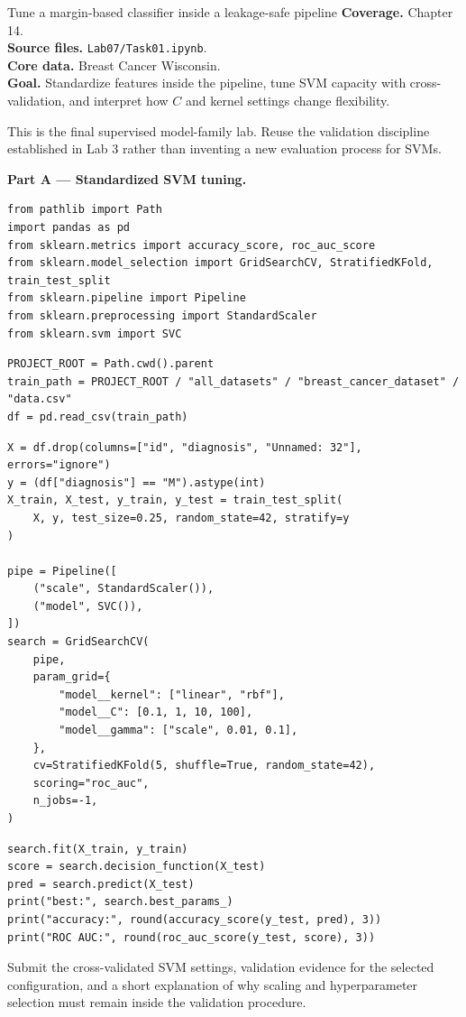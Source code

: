 
\begin{labproject}{Tune a margin-based classifier inside a leakage-safe pipeline}
\textbf{Coverage.} Chapter 14.\\
\textbf{Source files.} \texttt{Lab07/Task01.ipynb}.\\
\textbf{Core data.} Breast Cancer Wisconsin.\\
\textbf{Goal.} Standardize features inside the pipeline, tune SVM capacity with cross-validation, and interpret how $C$ and kernel settings change flexibility.

\begin{labmode}
This is the final supervised model-family lab. Reuse the validation discipline established in Lab 3 rather than inventing a new evaluation process for SVMs.
\end{labmode}

\medskip\noindent\textbf{Part A --- Standardized SVM tuning.}\par
\begin{lstlisting}[style=mlpython]
from pathlib import Path
import pandas as pd
from sklearn.metrics import accuracy_score, roc_auc_score
from sklearn.model_selection import GridSearchCV, StratifiedKFold, train_test_split
from sklearn.pipeline import Pipeline
from sklearn.preprocessing import StandardScaler
from sklearn.svm import SVC
\end{lstlisting}

\begin{lstlisting}[style=mlpython]
PROJECT_ROOT = Path.cwd().parent
train_path = PROJECT_ROOT / "all_datasets" / "breast_cancer_dataset" / "data.csv"
df = pd.read_csv(train_path)
\end{lstlisting}

\begin{lstlisting}[style=mlpython]
X = df.drop(columns=["id", "diagnosis", "Unnamed: 32"], errors="ignore")
y = (df["diagnosis"] == "M").astype(int)
X_train, X_test, y_train, y_test = train_test_split(
    X, y, test_size=0.25, random_state=42, stratify=y
)

pipe = Pipeline([
    ("scale", StandardScaler()),
    ("model", SVC()),
])
search = GridSearchCV(
    pipe,
    param_grid={
        "model__kernel": ["linear", "rbf"],
        "model__C": [0.1, 1, 10, 100],
        "model__gamma": ["scale", 0.01, 0.1],
    },
    cv=StratifiedKFold(5, shuffle=True, random_state=42),
    scoring="roc_auc",
    n_jobs=-1,
)
\end{lstlisting}

\begin{lstlisting}[style=mlpython]
search.fit(X_train, y_train)
score = search.decision_function(X_test)
pred = search.predict(X_test)
print("best:", search.best_params_)
print("accuracy:", round(accuracy_score(y_test, pred), 3))
print("ROC AUC:", round(roc_auc_score(y_test, score), 3))
\end{lstlisting}

\end{labproject}

\begin{labdeliverable}
Submit the cross-validated SVM settings, validation evidence for the selected configuration, and a short explanation of why scaling and hyperparameter selection must remain inside the validation procedure.
\end{labdeliverable}
